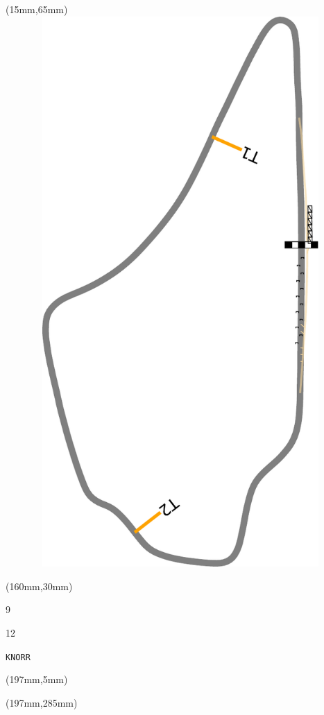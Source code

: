 \begin{textblock*}{185mm}(15mm,65mm)%
\centering
\mbox{\includegraphics[width=185mm,height=210mm,keepaspectratio]{PT/KNORR.pdf}}
\end{textblock*}
\begin{textblock*}{40mm}(160mm,30mm)%
\Large
\par{} 
\par9 
\par12 
\par\hfill\tiny\tt KNORR\\
\end{textblock*}
\begin{textblock*}{20mm}(197mm,5mm)%
\fbox{\thepage}
\label{KNORR}
\end{textblock*}
\begin{textblock*}{20mm}(197mm,285mm)%
\fbox{\thepage}
\end{textblock*}

